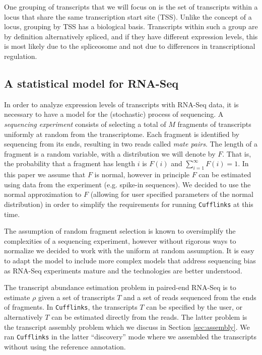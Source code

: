 \documentclass[12pt]{amsart}
\theoremstyle{definition}
\begin{document}
One grouping of transcripts that we will focus on is the set of transcripts
within a locus that share the same transcription start site (TSS). Unlike the
concept of a locus, grouping by TSS has a biological basis. Transcripts
within such a group are by definition alternatively spliced, and if they have
different expression levels, this is most likely due to the spliceosome and
not due to differences in transcriptional regulation.

\subsection{A statistical model for RNA-Seq}

In order to analyze expression levels of transcripts with RNA-Seq data, it is
necessary to have a model for the (stochastic) process of sequencing. A {\em
sequencing experiment} consists of selecting a total of $M$ fragments of
transcripts uniformly at random from the transcriptome. Each fragment is
identified by sequencing from its ends, resulting in two reads called {\em
mate pairs}. The length of a fragment is a random variable, with a
distribution we will denote by $F$. That is, the probability that a fragment
has length $i$ is $F(i)$ and $\sum_{i=1}^{\infty} F(i) = 1$. In this paper we
assume that $F$ is normal, however in principle $F$ can be estimated using
data from the experiment (e.g. spike-in sequences). We decided to use
the normal approximation to $F$ (allowing for user specified
parameters of the normal distribution) in order to simplify the
requirements for running {\tt Cufflinks} at this time. 

The assumption of random
fragment selection is known to oversimplify the complexities of a sequencing
experiment, however without rigorous ways to normalize we decided to work with
the uniform at random assumption. It is easy to adapt the model to include
more complex models that address sequencing bias as RNA-Seq experiments mature
and the technologies are better understood.

The transcript abundance estimation problem in paired-end RNA-Seq is to
estimate $\rho$ given a set of transcripts $T$ and a set of reads sequenced
from the ends of fragments. In {\tt Cufflinks}, the transcripts $T$ can be
specified by the user, or alternatively $T$ can be estimated directly from the
reads. The latter problem is the transcript assembly problem which we discuss
in Section \ref{sec:assembly}. We ran {\tt Cufflinks} in the latter
``discovery'' mode where we assembled the transcripts without using the
reference annotation.
\end{document}
